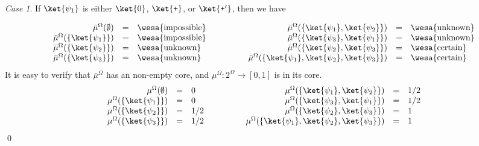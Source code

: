 \documentclass{article}
\theoremstyle{remark}
\newtheorem{case}{Case}
\newcommand{\pmeas}{\ensuremath{\mu}}
\newcommand{\ps}{\texttt{+}}
\newcommand{\imposs}{{\mbox{\wesa{impossible}}}}
\newcommand{\necess}{{\mbox{\wesa{certain}}}}
\newcommand{\unknown}{{\mbox{\wesa{unknown}}}}
\begin{document}
\begin{case}If $\ket{\psi_{1}}$ is either $\ket{0}$, $\ket{\ps}$,
or $\ket{\ps'}$, then we have

\[
\begin{array}{c@{\qquad\qquad}c}
\begin{array}{rcl}
\bar{\mu}^{\Omega}(\emptyset) & = & \imposs\\
\bar{\mu}^{\Omega}(\{\ket{\psi_{1}}\}) & = & \imposs\\
\bar{\mu}^{\Omega}(\{\ket{\psi_{2}}\}) & = & \unknown\\
\bar{\mu}^{\Omega}(\{\ket{\psi_{3}}\}) & = & \unknown
\end{array} & \begin{array}{rcl}
\bar{\mu}^{\Omega}(\{\ket{\psi_{1}},\ket{\psi_{2}}\}) & = & \unknown\\
\bar{\mu}^{\Omega}(\{\ket{\psi_{3}},\ket{\psi_{1}}\}) & = & \unknown\\
\bar{\mu}^{\Omega}(\{\ket{\psi_{2}},\ket{\psi_{3}}\}) & = & \necess\\
\bar{\mu}^{\Omega}(\{\ket{\psi_{1}},\ket{\psi_{2}},\ket{\psi_{3}}\}) & = & \necess
\end{array}\end{array}
\]
It is easy to verify that $\bar{\mu}^{\Omega}$ has an non-empty core,
and $\pmeas^{\Omega}:2^{\Omega}\rightarrow\left[0,1\right]$ is in
its core. 
\[
\begin{array}{c@{\qquad\qquad}c}
\begin{array}{rcl}
\pmeas^{\Omega}(\emptyset) & = & 0\\
\pmeas^{\Omega}(\{\ket{\psi_{1}}\}) & = & 0\\
\pmeas^{\Omega}(\{\ket{\psi_{2}}\}) & = & 1/2\\
\pmeas^{\Omega}(\{\ket{\psi_{3}}\}) & = & 1/2
\end{array} & \begin{array}{rcl}
\pmeas^{\Omega}(\{\ket{\psi_{1}},\ket{\psi_{2}}\}) & = & 1/2\\
\pmeas^{\Omega}(\{\ket{\psi_{3}},\ket{\psi_{1}}\}) & = & 1/2\\
\pmeas^{\Omega}(\{\ket{\psi_{2}},\ket{\psi_{3}}\}) & = & 1\\
\pmeas^{\Omega}(\{\ket{\psi_{1}},\ket{\psi_{2}},\ket{\psi_{3}}\}) & = & 1
\end{array}\end{array}
\]
\qed\end{case}
\end{document}
